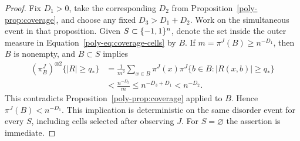 \begin{proof}
Fix $D_1>0$, take the corresponding $D_2$ from
Proposition~\ref{poly-prop:coverage}, and choose any fixed
$D_3>D_1+D_2$. Work on the simultaneous event in that proposition.
Given $S\subset\{-1,1\}^n$, denote the set inside the outer measure in
Equation~\eqref{poly-eq:coverage-cells} by $B$.
If $m=\pi^J(B)\ge n^{-D_1}$, then $B$ is nonempty, and $B\subset S$
implies
\begin{align*}
 (\pi_B^J)^{\otimes2}\{|R|\ge q_*\}
 &=\frac1{m^2}\sum_{x\in B}\pi^J(x)
             \pi^J\{b\in B:|R(x,b)|\ge q_*\}\\
 &<\frac{n^{-D_3}}m
 \le n^{-D_3+D_1}<n^{-D_2}.
\end{align*}
This contradicts Proposition~\ref{poly-prop:coverage} applied to $B$.
Hence $\pi^J(B)<n^{-D_1}$. This implication is deterministic on the
same disorder event for every $S$, including cells selected after
observing $J$. For $S=\varnothing$ the assertion is immediate.
\end{proof}
